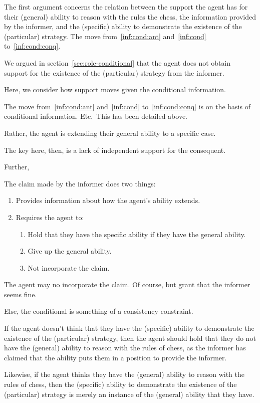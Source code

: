 \documentclass[10pt]{article}
\begin{document}
\begin{note}[Overview]
  The first argument concerns the relation between the support the agent has for their (general) ability to reason with the rules the chess, the information provided by the informer, and the (specific) ability to demonstrate the existence of the (particular) strategy.
  The move from~\ref{inf:cond:ant} and~\ref{inf:cond} to~\ref{inf:cond:conq}.

  We argued in section~\ref{sec:role-conditional} that the agent does not obtain support for the existence of the (particular) strategy from the informer.

  Here, we consider how support moves given the conditional information.
\end{note}

\begin{note}
  The move from~\ref{inf:cond:ant} and~\ref{inf:cond} to~\ref{inf:cond:conq} is on the basis of conditional information.
  Etc.\
  This has been detailed above.

  Rather, the agent is extending their general ability to a specific case.
\end{note}

\begin{note}
  The key here, then, is a lack of independent support for the consequent.

  Further, 
\end{note}

\begin{note}
  The claim made by the informer does two things:
  \begin{enumerate}
  \item Provides information about how the agent's ability extends.
  \item Requires the agent to:
    \begin{enumerate}
    \item Hold that they have the specific ability if they have the general ability.
    \item Give up the general ability.
    \item Not incorporate the claim.
    \end{enumerate}
  \end{enumerate}

  The agent may no incorporate the claim.
  Of course, but grant that the informer seems fine.

  Else, the conditional is something of a consistency constraint.

  If the agent doesn't think that they have the (specific) ability to demonstrate the existence of the (particular) strategy, then the agent should hold that they do not have the (general) ability to reason with the rules of chess, as the informer has claimed that the ability puts them in a position to provide the informer.

  Likewise, if the agent thinks they have the (general) ability to reason with the rules of chess, then the (specific) ability to demonstrate the existence of the (particular) strategy is merely an instance of the (general) ability that they have.
\end{note}
\end{document}
